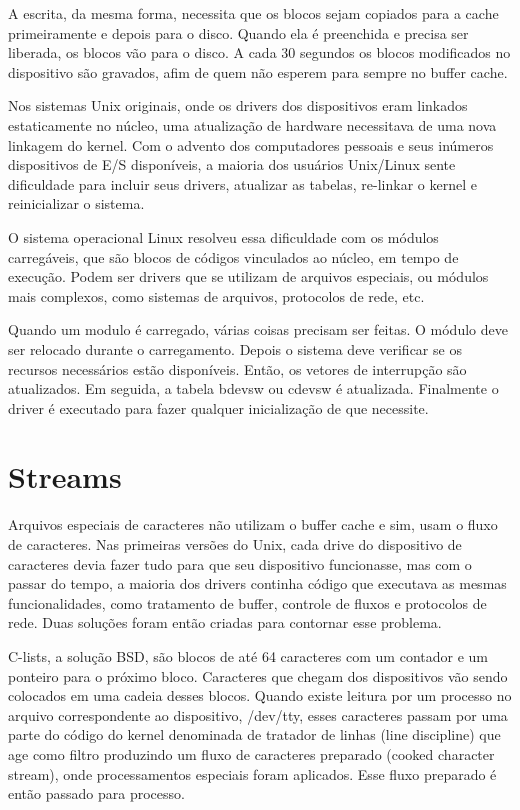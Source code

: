 A escrita, da mesma forma, necessita que os blocos sejam copiados para a cache primeiramente e depois para o disco. Quando ela é preenchida e precisa ser liberada, os blocos vão para o disco. A cada 30 segundos os blocos modificados no dispositivo são gravados, afim de quem não esperem para sempre no buffer cache.

Nos sistemas Unix originais, onde os drivers dos dispositivos eram linkados estaticamente no núcleo, uma atualização de hardware necessitava de uma nova linkagem do kernel. Com o advento dos computadores pessoais e seus inúmeros dispositivos de E/S disponíveis, a maioria dos usuários Unix/Linux sente dificuldade para incluir seus drivers, atualizar as tabelas, re-linkar o kernel e reinicializar o sistema.

O sistema operacional Linux resolveu essa dificuldade com os módulos carregáveis, que são blocos de códigos vinculados ao núcleo, em tempo de execução. Podem ser drivers que se utilizam de arquivos especiais, ou módulos mais complexos, como sistemas de arquivos, protocolos de rede, etc.

Quando um modulo é carregado, várias coisas precisam ser feitas. O módulo deve ser relocado durante o carregamento. Depois o sistema deve verificar se os recursos necessários estão disponíveis. Então, os vetores de interrupção são atualizados. Em seguida, a tabela bdevsw ou cdevsw é atualizada. Finalmente o driver é executado para fazer qualquer inicialização de que necessite.

\section{Streams}

Arquivos especiais de caracteres não utilizam o buffer cache e sim, usam o fluxo de caracteres. Nas primeiras versões do Unix, cada drive do dispositivo de caracteres devia fazer tudo para que seu dispositivo funcionasse, mas com o passar do tempo, a maioria dos drivers continha código que executava as mesmas funcionalidades, como tratamento de buffer, controle de fluxos e protocolos de rede. Duas soluções foram então criadas para contornar esse problema.

C-lists, a solução BSD, são blocos de até 64 caracteres com um contador e um ponteiro para o próximo bloco. Caracteres que chegam dos dispositivos vão sendo colocados em uma cadeia desses blocos. Quando existe leitura por um processo no arquivo correspondente ao dispositivo, /dev/tty, esses caracteres passam por uma parte do código do kernel denominada de tratador de linhas (line discipline) que age como filtro produzindo um fluxo de caracteres preparado (cooked character stream), onde processamentos especiais foram aplicados. Esse fluxo preparado é então passado para processo.

